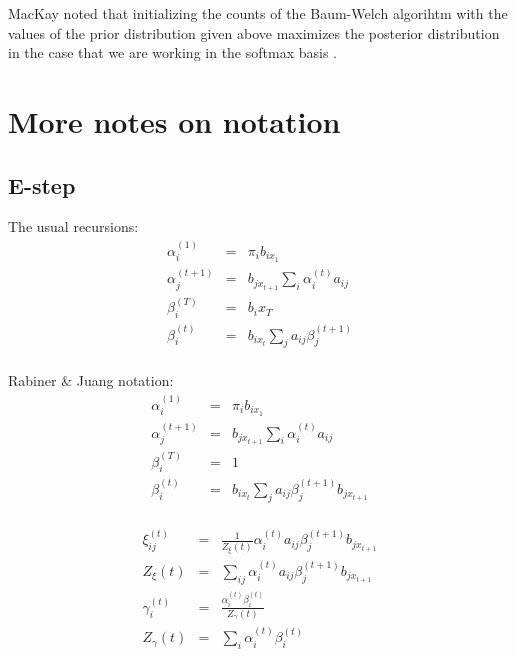 \documentclass{article}
\begin{document}
MacKay noted that initializing the counts of the Baum-Welch algorihtm
with the values of the prior distribution given above maximizes the posterior
distribution in the case that we are working in the softmax
basis \cite{mackay:1997}.

\section{More notes on notation}

\subsection{E-step}
The usual recursions:
\begin{eqnarray*}
\alpha_i^{(1)} &=& \pi_i b_{ix_1} \\
\alpha_j^{(t+1)} &=& b_{jx_{t+1}} \sum_i \alpha_i^{(t)} a_{ij} \\
\beta_i^{(T)} &=& b_i x_T \\
\beta_i^{(t)} &=& b_{ix_t} \sum_j a_{ij} \beta_j^{(t+1)} \\
\end{eqnarray*}

\noindent
Rabiner \& Juang notation:
\begin{eqnarray*}
\alpha_i^{(1)} &=& \pi_i b_{ix_1} \\
\alpha_j^{(t+1)} &=& b_{jx_{t+1}} \sum_i \alpha_i^{(t)} a_{ij} \\
\beta_i^{(T)} &=& 1 \\
\beta_i^{(t)} &=& b_{ix_t} \sum_j a_{ij} \beta_j^{(t+1)} b_{jx_{t+1}} \\
\end{eqnarray*}

\begin{eqnarray*}
\xi_{ij}^{(t)}
&=& \frac {1}{Z_\xi(t)} \alpha_i^{(t)} a_{ij} \beta_j^{(t+1)} b_{jx_{t+1}} \\
Z_\xi(t) &=& \sum_{ij} \alpha_i^{(t)} a_{ij} \beta_j^{(t+1)} b_{jx_{t+1}} \\
\gamma_i^{(t)}
&=& \frac { \alpha_i^{(t)} \beta_i^{(t)} } { Z_\gamma(t) } \\
Z_\gamma(t) &=& \sum_i \alpha_i^{(t)} \beta_i^{(t)} \\
\end{eqnarray*}
\end{document}
